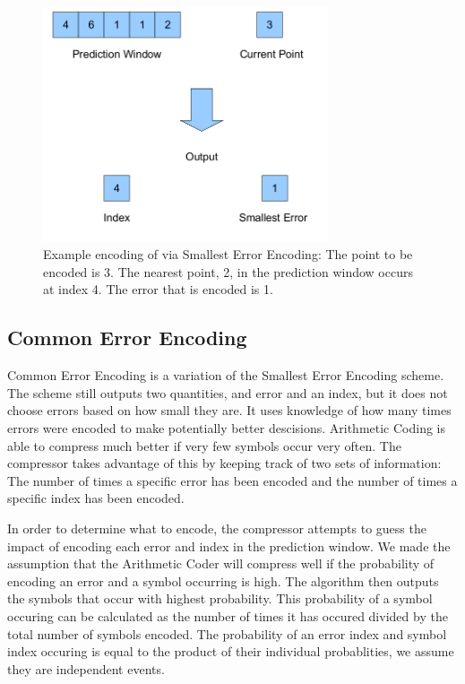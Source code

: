 \documentclass[a4paper,11pt]{report}
\begin{document}
\begin{figure}
 \center
 \includegraphics[width=0.75\textwidth]{resources/Nearest.png}
\caption{Example encoding of via Smallest Error Encoding: The point to be encoded is 3. The nearest point, 2, in the prediction window occurs at index 4. The error that is encoded is 1.}
\label{NearestDescrip}
\end{figure}

\subsection{Common Error Encoding}

Common Error Encoding is a variation of the Smallest Error Encoding scheme. The scheme still outputs two quantities, and error and an index, but it does not choose errors based on how small they are. It uses knowledge of how many times errors were encoded to make potentially better descisions. Arithmetic Coding is able to compress much better if very few symbols occur very often. The compressor takes advantage of this by keeping track of two sets of information: The number of times a specific error has been encoded and the number of times a specific index has been encoded. 

In order to determine what to encode, the compressor attempts to guess the impact of encoding each error and index in the prediction window. We made the assumption that the Arithmetic Coder will compress well if the probability of encoding an error and a symbol occurring is high. The algorithm then outputs the symbols that occur with highest probability. This probability of a symbol occuring can be calculated as the number of times it has occured divided by the total number of symbols encoded. The probability of an error index and symbol index occuring is equal to the product of their individual probablities, we assume they are independent events.
\end{document}

